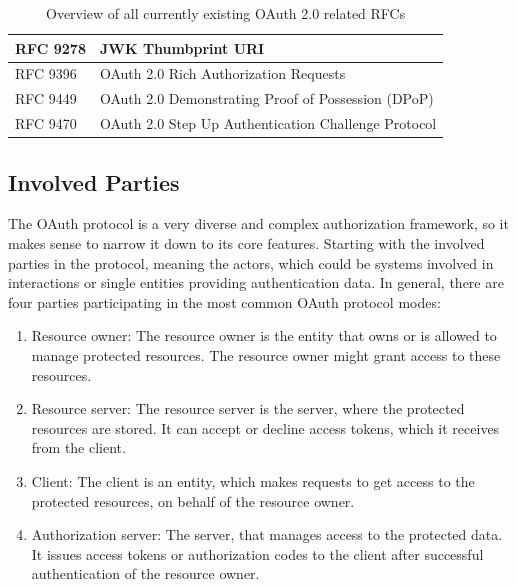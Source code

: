 \begin{table}[H]
{\begin{tabular}{@{}ll@{}}
	\multicolumn{1}{|l|}{RFC 9278} & \multicolumn{1}{l|}{JWK Thumbprint URI}                                                             \\ \midrule
	\multicolumn{1}{|l|}{RFC 9396} & \multicolumn{1}{l|}{OAuth 2.0 Rich Authorization Requests}                                          \\ \midrule
	\multicolumn{1}{|l|}{RFC 9449} & \multicolumn{1}{l|}{OAuth 2.0 Demonstrating Proof of Possession (DPoP)}                             \\ \midrule
	\multicolumn{1}{|l|}{RFC 9470} & \multicolumn{1}{l|}{OAuth 2.0 Step Up Authentication Challenge Protocol}                            \\ \bottomrule
	\end{tabular}%
	}
	\caption{Overview of all currently existing OAuth 2.0 related  RFCs}
	\label{tab:OAuthRFC}
\end{table}


\subsection{Involved Parties}
The OAuth protocol is a very diverse and complex authorization framework, so it makes sense to narrow it down to its core
features. Starting with the involved parties in the protocol, meaning the actors, which could be systems involved in interactions or single entities providing authentication data. In general, there
are four parties participating in the most common OAuth protocol modes:

\begin{enumerate} 

    \item Resource owner: The resource owner is the entity that owns or is allowed to manage protected resources. The resource owner might grant access to these resources. 

    \item Resource server: The resource server is the server, where the protected resources are stored. It can accept or decline access tokens, which it receives from the client. 

    \item Client: The client is an entity, which makes requests to get access to the protected resources, on behalf of the resource owner. 
        
    \item Authorization server: The server, that manages access to the protected data. It issues access tokens or authorization codes to the client after successful authentication of the resource owner. 

\end{enumerate}

